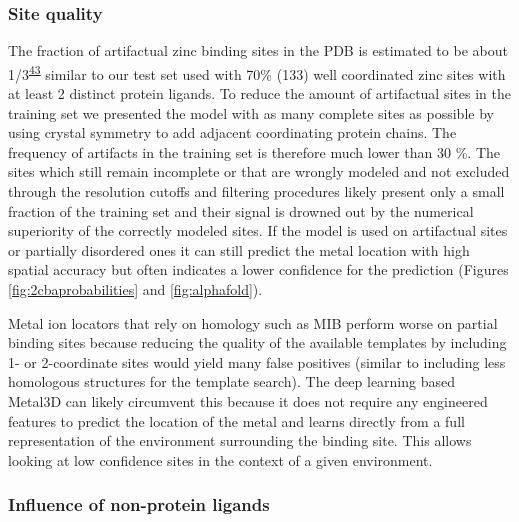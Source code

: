 \documentclass[  ASAPversion,
  ,
  9pt]{elife}
\begin{document}
\hypertarget{site-quality}{%
\subsubsection{Site quality}\label{site-quality}}

The fraction of artifactual zinc binding sites in the PDB is estimated to be about 1/3\textsuperscript{\protect\hyperlink{ref-Wt0ducot}{43}} similar to our test set used with 70\% (133) well coordinated zinc sites with at least 2 distinct protein ligands. To reduce the amount of artifactual sites in the training set we presented the model with as many complete sites as possible by using crystal symmetry to add adjacent coordinating protein chains. The frequency of artifacts in the training set is therefore much lower than 30 \%. The sites which still remain incomplete or that are wrongly modeled and not excluded through the resolution cutoffs and filtering procedures likely present only a small fraction of the training set and their signal is drowned out by the numerical superiority of the correctly modeled sites. If the model is used on artifactual sites or partially disordered ones it can still predict the metal location with high spatial accuracy but often indicates a lower confidence for the prediction (Figures \ref{fig:2cbaprobabilities} and \ref{fig:alphafold}).

Metal ion locators that rely on homology such as MIB perform worse on partial binding sites because reducing the quality of the available templates by including 1- or 2-coordinate sites would yield many false positives (similar to including less homologous structures for the template search). The deep learning based Metal3D can likely circumvent this because it does not require any engineered features to predict the location of the metal and learns directly from a full representation of the environment surrounding the binding site. This allows looking at low confidence sites in the context of a given environment.

\hypertarget{influence-of-non-protein-ligands}{%
\subsubsection{Influence of non-protein ligands}\label{influence-of-non-protein-ligands}}
\end{document}

